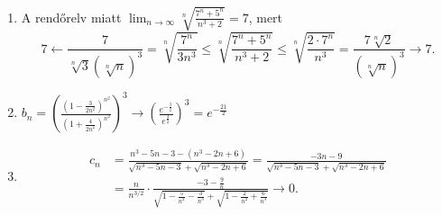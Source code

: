 \documentclass[11pt]{scrartcl}
\begin{document}
\begin{enumerate}
	\item A rendőrelv miatt
	      \(\displaystyle
	      \lim_{n \to \infty} \sqrt[n]{\frac{7^n + 5^n}{n^3 + 2}} = 7
	      \), mert
	      \[
		      7
		      \leftarrow
		      \frac{7}{\sqrt[n]{3} \left(\sqrt[n]{n}\right)^3}
		      =
		      \sqrt[n]{\frac{7^n}{3n^3}}
		      \le
		      \sqrt[n]{\frac{7^n + 5^n}{n^3 + 2}}
		      \le
		      \sqrt[n]{\frac{2 \cdot 7^n}{n^3}}
		      =
		      \frac{7 \sqrt[n]{2}}{\left(\sqrt[n]{n}\right)^3}
		      \to
		      7.
	      \]

	\item \(\displaystyle
	      b_n
	      = \left(
	      \frac{\left(1 - \frac{3}{2n^2}\right)^{n^2}}{\left(1 + \frac{4}{2n^2}\right)^{n^2}}
	      \right)^3
	      \to
	      \left( \frac{e^{-\frac{3}{2}}}{e^{\frac{4}{2}}} \right)^3
	      = e^{-\frac{21}{2}}
	      \)

	\item \[
		      \begin{aligned}
			      c_n
			       & =
			      \frac{n^3 - 5n - 3 - (n^3 - 2n + 6)}{\sqrt{n^3 - 5n - 3} + \sqrt{n^3 - 2n + 6}}
			      =
			      \frac{-3n - 9}{\sqrt{n^3 - 5n - 3} + \sqrt{n^3 - 2n + 6}} \\
			       & =
			      \frac{n}{n^{3/2}} \cdot
			      \frac{-3 - \frac{9}{n}}{
				      \sqrt{1 - \frac{5}{n^2} - \frac{3}{n^3}} + \sqrt{1 - \frac{2}{n^2} + \frac{6}{n^3}}
			      }
			      \to 0.
		      \end{aligned}
	      \]
\end{enumerate}
\end{document}
